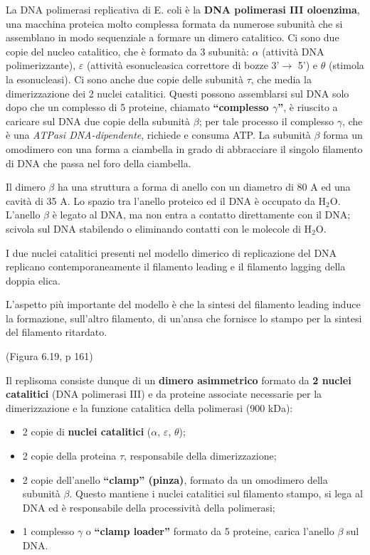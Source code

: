 \documentclass[11pt]{book}
\begin{document}
La DNA polimerasi replicativa di E. coli è la \textbf{DNA polimerasi III
oloenzima}, una macchina proteica molto complessa formata da numerose
subunità che si assemblano in modo sequenziale a formare un dimero
catalitico. Ci sono due copie del nucleo catalitico, che è formato da 3
subunità: \textbf{\(\alpha\)} (attività DNA polimerizzante),
\textbf{\(\varepsilon\)} (attività esonucleasica correttore di bozze
3'\(\rightarrow\) 5') e \textbf{\(\theta\)} (stimola la esonucleasi). Ci
sono anche due copie delle subunità \textbf{\(\tau\)}, che media la
dimerizzazione dei 2 nuclei catalitici. Questi possono assemblarsi sul
DNA solo dopo che un complesso di 5 proteine, chiamato
\textbf{``complesso \(\gamma\)''}, è riuscito a caricare sul DNA due
copie della subunità \(\beta\); per tale processo il complesso
\(\gamma\), che è una \emph{ATPasi DNA-dipendente}, richiede e consuma
ATP. La subunità \textbf{\(\beta\)} forma un omodimero con una forma a
ciambella in grado di abbracciare il singolo filamento di DNA che passa
nel foro della ciambella.

Il dimero \(\beta\) ha una struttura a forma di anello con un diametro
di 80 A ed una cavità di 35 A. Lo spazio tra l'anello proteico ed il DNA
è occupato da H\(_2\)O. L'anello \(\beta\) è legato al DNA, ma non entra
a contatto direttamente con il DNA; scivola sul DNA stabilendo o
eliminando contatti con le molecole di H\(_2\)O.

I due nuclei catalitici presenti nel modello dimerico di replicazione
del DNA replicano contemporaneamente il filamento leading e il filamento
lagging della doppia elica.

L'aspetto più importante del modello è che la sintesi del filamento
leading induce la formazione, sull'altro filamento, di un'ansa che
fornisce lo stampo per la sintesi del filamento ritardato.

(Figura 6.19, p 161)

Il replisoma consiste dunque di un \textbf{dimero asimmetrico} formato
da \textbf{2 nuclei catalitici} (DNA polimerasi III) e da proteine
associate necessarie per la dimerizzazione e la funzione catalitica
della polimerasi (900 kDa):

\begin{itemize}
\itemsep1pt\parskip0pt
\item
  2 copie di \textbf{nuclei catalitici} (\(\alpha\), \(\varepsilon\),
  \(\theta\));
\item
  2 copie della proteina \(\tau\), responsabile della dimerizzazione;
\item
  2 copie dell'anello \textbf{``clamp'' (pinza)}, formato da un
  omodimero della subunità \(\beta\). Questo mantiene i nuclei
  catalitici sul filamento stampo, si lega al DNA ed è responsabile
  della processività della polimerasi;
\item
  1 complesso \(\gamma\) o \textbf{``clamp loader''} formato da 5
  proteine, carica l'anello \(\beta\) sul DNA.
\end{itemize}
\end{document}

